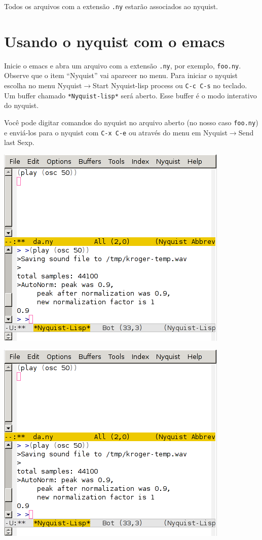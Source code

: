\documentclass[12pt,brazil]{book}
\newcommand{\sep}{$\rightarrow$}
\begin{document}
Todos os arquivos com a extensão \texttt{.ny} estarão associados ao
nyquist.

\section{Usando o nyquist com o emacs}
\label{sec:usando-o-nyquist}

Inicie o emacs e abra um arquivo com a extensão \texttt{.ny}, por
exemplo, \texttt{foo.ny}. Observe que o item ``Nyquist'' vai aparecer
no menu. Para iniciar o nyquist escolha no menu Nyquist\sep Start
Nyquist-lisp process ou \texttt{C-c C-s} no teclado. Um buffer chamado
\texttt{*Nyquist-lisp*} será aberto. Esse buffer é o modo interativo
do nyquist.

Você pode digitar comandos do nyquist no arquivo aberto (no nosso caso
\texttt{foo.ny}) e enviá-los para o nyquist com \texttt{C-x C-e} ou
através do menu em Nyquist\sep Send last Sexp.

\begin{htmlonly}
  \includegraphics{ny2}
\end{htmlonly}

\begin{latexonly}
  \includegraphics[scale=.5]{ny2}
\end{latexonly}
\end{document}
